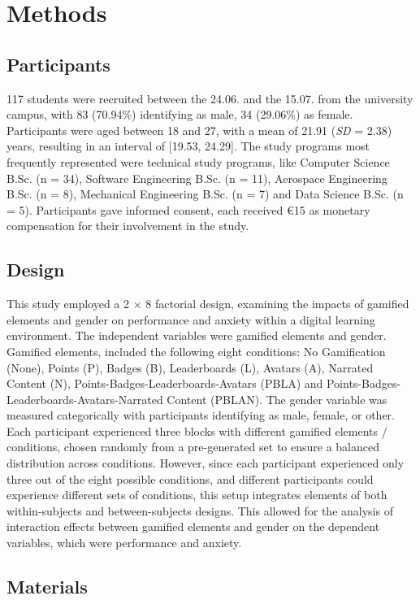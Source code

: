 \section{Methods}
\subsection{Participants}
117 students were recruited between the 24.06. and the 15.07. from the university campus, with 83 (70.94\%) identifying as male, 34 (29.06\%) as female.
Participants were aged between 18 and 27, with a mean of 21.91 (\textit{SD} = 2.38) years, resulting in an interval of [19.53, 24.29].
The study programs most frequently represented were technical study programs, like Computer Science B.Sc. (n = 34), Software Engineering B.Sc. (n = 11), Aerospace Engineering B.Sc. (n = 8), Mechanical Engineering B.Sc. (n = 7) and Data Science B.Sc. (n = 5).
Participants gave informed consent, each received €15 as monetary compensation for their involvement in the study.

\subsection{Design}
This study employed a 2 $\times$ 8 factorial design, examining the impacts of gamified elements and gender on performance and anxiety within a digital learning environment.
The independent variables were gamified elements and gender.
Gamified elements, included the following eight conditions: No Gamification (None), Points (P), Badges (B), Leaderboards (L), Avatars (A), Narrated Content (N), Points-Badges-Leaderboards-Avatars (PBLA) and Points-Badges-Leaderboards-Avatars-Narrated Content (PBLAN).
The gender variable was measured categorically with participants identifying as male, female, or other.
Each participant experienced three blocks with different gamified elements / conditions, chosen randomly from a pre-generated set to ensure a balanced distribution across conditions.
However, since each participant experienced only three out of the eight possible conditions, and different participants could experience different sets of conditions, this setup integrates elements of both within-subjects and between-subjects designs.
This allowed for the analysis of interaction effects between gamified elements and gender on the dependent variables, which were performance and anxiety.

\subsection{Materials}
